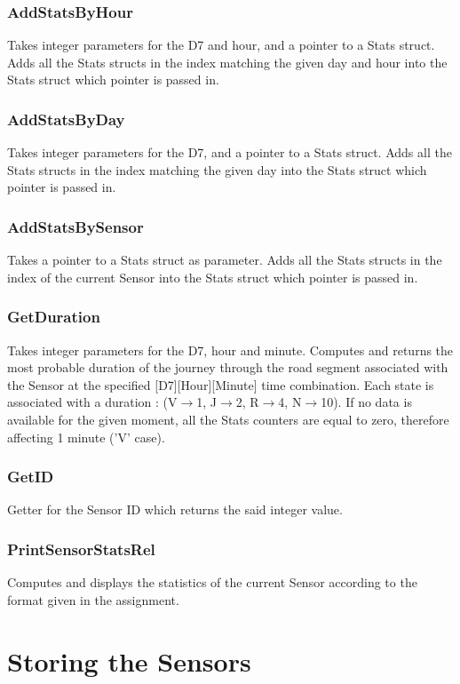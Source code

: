 \documentclass[10pt]{article}
\begin{document}
\subsubsection*{AddStatsByHour}
Takes integer parameters for the D7 and hour\footnotemark[1], and a pointer to a Stats struct. Adds all the Stats structs in the index matching the given day and hour into the Stats struct which pointer is passed in.

\subsubsection*{AddStatsByDay}
Takes integer parameters for the D7\footnotemark[1], and a pointer to a Stats struct. Adds all the Stats structs in the index matching the given day into the Stats struct which pointer is passed in.

\subsubsection*{AddStatsBySensor}
Takes a pointer to a Stats struct as parameter. Adds all the Stats structs in the index of the current Sensor into the Stats struct which pointer is passed in.

\subsubsection*{GetDuration}
Takes integer parameters for the D7, hour and minute\footnotemark[1]. Computes and returns the most probable duration of the journey through the road segment associated with the Sensor at the specified [D7][Hour][Minute] time combination. Each state is associated with a duration : (V$\to$1, J$\to$2, R$\to$4, N$\to$10). If no data is available for the given moment, all the Stats counters are equal to zero, therefore affecting 1 minute ('V' case).

\subsubsection*{GetID}
Getter for the Sensor ID which returns the said integer value.

\subsubsection*{PrintSensorStatsRel}
Computes and displays the statistics of the current Sensor according to the format given in the assignment.

\section{Storing the Sensors}
\end{document}

